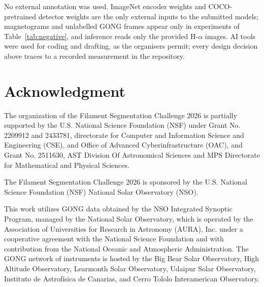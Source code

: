 \documentclass[sigconf]{acmart}
\begin{document}
No external annotation was used. ImageNet encoder weights and COCO-pretrained detector weights are the only external inputs to the submitted models; magnetograms and unlabelled GONG frames appear only in experiments of Table~\ref{tab:negative}, and inference reads only the provided H-$\alpha$ images. AI tools were used for coding and drafting, as the organisers permit; every design decision above traces to a recorded measurement in the repository.

\section{Acknowledgment}\label{sec:acknowledgment}
    The organization of the Filament Segmentation Challenge 2026 is partially supported by the U.S. National Science Foundation (NSF) under Grant No. 2209912 and 2433781, directorate for Computer and Information Science and Engineering (CSE), and Office of Advanced Cyberinfrastructure (OAC), and Grant No. 2511630, AST Division Of Astronomical Sciences and MPS Directorate for Mathematical and Physical Sciences.

    The Filament Segmentation Challenge 2026 is sponsored by the U.S. National Science Foundation (NSF) National Solar Observatory (NSO).

    This work utilizes GONG data obtained by the NSO Integrated Synoptic Program, managed by the National Solar Observatory, which is operated by the Association of Universities for Research in Astronomy (AURA), Inc. under a cooperative agreement with the National Science Foundation and with contribution from the National Oceanic and Atmospheric Administration. The GONG network of instruments is hosted by the Big Bear Solar Observatory, High Altitude Observatory, Learmonth Solar Observatory, Udaipur Solar Observatory, Instituto de Astrofísica de Canarias, and Cerro Tololo Interamerican Observatory.



\end{document}
